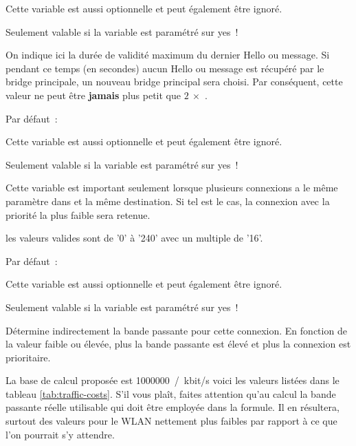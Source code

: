\begin{description}
  Cette variable est aussi optionnelle et peut également être ignoré.

  Seulement valable si la variable  est paramétré
  sur yes~!

  On indique ici la durée de validité maximum du dernier Hello ou message.
  Si pendant ce temps (en secondes) aucun Hello ou message est récupéré par
  le bridge principale, un nouveau bridge principal sera choisi. Par conséquent,
  cette valeur ne peut être \textbf{jamais} plus petit que $2\ \times$ .


  Par défaut~: 

  Cette variable est aussi optionnelle et peut également être ignoré.

  Seulement valable si la variable  est paramétré
  sur yes~!

  Cette variable est important seulement lorsque plusieurs connexions a
  le même paramètre dans  et la même
  destination. Si tel est le cas, la connexion avec la priorité la plus faible
  sera retenue.

  les valeurs valides sont de '0' à '240' avec un multiple de '16'.


  Par défaut~: 

  Cette variable est aussi optionnelle et peut également être ignoré.

  Seulement valable si la variable  est paramétré
  sur yes~!

  Détermine indirectement la bande passante pour cette connexion. En fonction de
  la valeur faible ou élevée, plus la bande passante est élevé et plus la connexion
  est prioritaire.
  
  La base de calcul proposée est 1000000~/~kbit/s voici les valeurs listées dans le
  tableau \ref{tab:traffic-costs}. S'il vous plaît, faites attention qu'au calcul
  la bande passante réelle utilisable qui doit être employée dans la formule. Il en
  résultera, surtout des valeurs pour le WLAN nettement plus faibles par rapport à
  ce que l'on pourrait s'y attendre.


\end{description}
